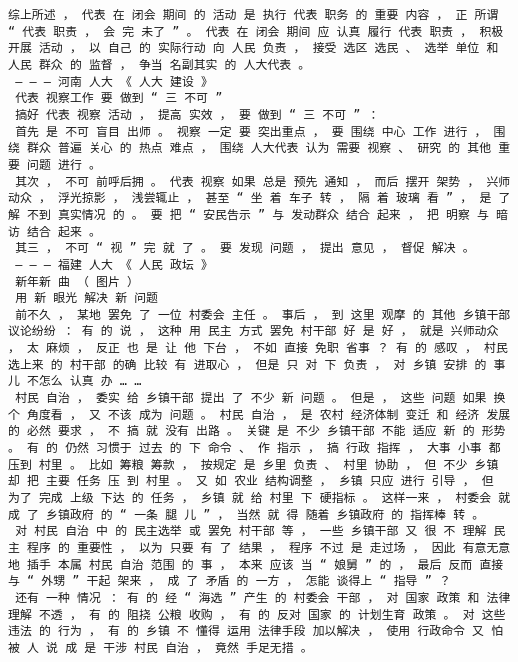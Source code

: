 \documentclass{article}
\begin{document}
\begin{Verbatim}[commandchars=\\\{\}]
 综上所述 ， 代表 在 闭会 期间 的 活动 是 执行 代表 职务 的 重要 内容 ， 正 所谓 “ 代表 职责 ， 会 完 未了 ” 。 代表 在 闭会 期间 应 认真 履行 代表 职责 ， 积极开展 活动 ， 以 自己 的 实际行动 向 人民 负责 ， 接受 选区 选民 、 选举 单位 和 人民 群众 的 监督 ， 争当 名副其实 的 人大代表 。 
 — — — 河南 人大 《 人大 建设 》 
 代表 视察工作 要 做到 “ 三 不可 ” 
 搞好 代表 视察 活动 ， 提高 实效 ， 要 做到 “ 三 不可 ” ： 
 首先 是 不可 盲目 出师 。 视察 一定 要 突出重点 ， 要 围绕 中心 工作 进行 ， 围绕 群众 普遍 关心 的 热点 难点 ， 围绕 人大代表 认为 需要 视察 、 研究 的 其他 重要 问题 进行 。 
 其次 ， 不可 前呼后拥 。 代表 视察 如果 总是 预先 通知 ， 而后 摆开 架势 ， 兴师动众 ， 浮光掠影 ， 浅尝辄止 ， 甚至 “ 坐 着 车子 转 ， 隔 着 玻璃 看 ” ， 是 了解 不到 真实情况 的 。 要 把 “ 安民告示 ” 与 发动群众 结合 起来 ， 把 明察 与 暗访 结合 起来 。 
 其三 ， 不可 “ 视 ” 完 就 了 。 要 发现 问题 ， 提出 意见 ， 督促 解决 。 
 — — — 福建 人大 《 人民 政坛 》 
 新年新 曲 （ 图片 ） 
 用 新 眼光 解决 新 问题 
 前不久 ， 某地 罢免 了 一位 村委会 主任 。 事后 ， 到 这里 观摩 的 其他 乡镇干部 议论纷纷 ： 有 的 说 ， 这种 用 民主 方式 罢免 村干部 好 是 好 ， 就是 兴师动众 ， 太 麻烦 ， 反正 也 是 让 他 下台 ， 不如 直接 免职 省事 ？ 有 的 感叹 ， 村民 选上来 的 村干部 的确 比较 有 进取心 ， 但是 只 对 下 负责 ， 对 乡镇 安排 的 事儿 不怎么 认真 办 … … 
 村民 自治 ， 委实 给 乡镇干部 提出 了 不少 新 问题 。 但是 ， 这些 问题 如果 换个 角度看 ， 又 不该 成为 问题 。 村民 自治 ， 是 农村 经济体制 变迁 和 经济 发展 的 必然 要求 ， 不 搞 就 没有 出路 。 关键 是 不少 乡镇干部 不能 适应 新 的 形势 。 有 的 仍然 习惯于 过去 的 下 命令 、 作 指示 ， 搞 行政 指挥 ， 大事 小事 都 压到 村里 。 比如 筹粮 筹款 ， 按规定 是 乡里 负责 、 村里 协助 ， 但 不少 乡镇 却 把 主要 任务 压 到 村里 。 又 如 农业 结构调整 ， 乡镇 只应 进行 引导 ， 但 为了 完成 上级 下达 的 任务 ， 乡镇 就 给 村里 下 硬指标 。 这样一来 ， 村委会 就 成 了 乡镇政府 的 “ 一条 腿 儿 ” ， 当然 就 得 随着 乡镇政府 的 指挥棒 转 。 
 对 村民 自治 中 的 民主选举 或 罢免 村干部 等 ， 一些 乡镇干部 又 很 不 理解 民主 程序 的 重要性 ， 以为 只要 有 了 结果 ， 程序 不过 是 走过场 ， 因此 有意无意 地 插手 本属 村民 自治 范围 的 事 ， 本来 应该 当 “ 娘舅 ” 的 ， 最后 反而 直接 与 “ 外甥 ” 干起 架来 ， 成 了 矛盾 的 一方 ， 怎能 谈得上 “ 指导 ” ？ 
 还有 一种 情况 ： 有 的 经 “ 海选 ” 产生 的 村委会 干部 ， 对 国家 政策 和 法律 理解 不透 ， 有 的 阻挠 公粮 收购 ， 有 的 反对 国家 的 计划生育 政策 。 对 这些 违法 的 行为 ， 有 的 乡镇 不 懂得 运用 法律手段 加以解决 ， 使用 行政命令 又 怕 被 人 说 成 是 干涉 村民 自治 ， 竟然 手足无措 。 

\end{Verbatim}
\end{document}
